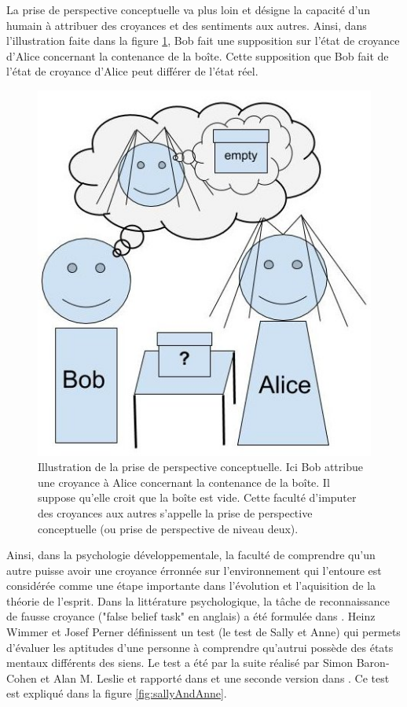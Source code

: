 \documentclass[a4paper,11pt,twoside]{StyleThese}
\begin{document}
La prise de perspective conceptuelle va plus loin et désigne la capacité d'un humain à attribuer des croyances et des sentiments aux autres\cite{Baron1985}.
Ainsi, dans l'illustration faite dans la figure \ref{fig:conceptual}, Bob fait une supposition sur l'état de croyance d'Alice concernant la contenance de la boîte.
Cette supposition que Bob fait de l'état de croyance d'Alice peut différer de l'état réel.

\begin{figure}[ht!]
 \centering
  \includegraphics[width=0.49\linewidth]{./img/conceptual.jpg} 
  \caption {Illustration de la prise de perspective conceptuelle. Ici Bob attribue une croyance à Alice concernant la contenance de la boîte. Il suppose qu'elle croit que la boîte est vide. Cette faculté d'imputer des croyances aux autres s'appelle la prise de perspective conceptuelle (ou prise de perspective de niveau deux).}
  \label{fig:conceptual}
\end{figure}

Ainsi, dans la psychologie développementale, la faculté de comprendre qu'un autre puisse avoir une croyance érronnée sur l'environnement qui l'entoure est considérée comme une étape importante dans l'évolution et l'aquisition de la théorie de l'esprit. Dans la littérature psychologique, la tâche de reconnaissance de fausse croyance ("false belief task" en anglais) a été formulée dans \cite{Wimmer1983103}. Heinz Wimmer et Josef Perner définissent un test (le test de Sally et Anne) qui permets d'évaluer les aptitudes d'une personne à comprendre qu'autrui possède des états mentaux différents des siens. Le test a été par la suite réalisé par Simon Baron-Cohen et Alan M. Leslie et rapporté dans \cite{Baron1985} et une seconde version dans \cite{Leslie1988}. Ce test est expliqué dans la figure \ref{fig:sallyAndAnne}.
\end{document}
